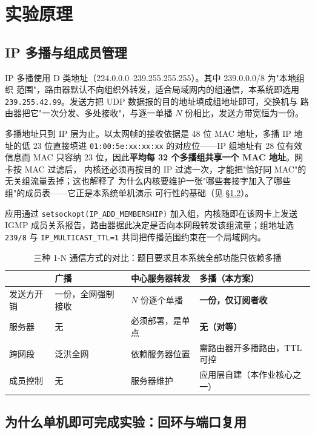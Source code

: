 \documentclass[11pt,a4paper,fontset=fandol]{ctexart}
\begin{document}
\section{实验原理}

\subsection{IP 多播与组成员管理}

IP 多播使用 D 类地址（224.0.0.0--239.255.255.255）。其中 239.0.0.0/8 为"本地组织
范围"，路由器默认不向组织外转发，适合局域网内的组通信，本系统即选用
\texttt{239.255.42.99}。发送方把 UDP 数据报的目的地址填成组地址即可，交换机与
路由器把它"一次分发、多处接收"，与逐一单播 $N$ 份相比，发送方带宽恒为一份。

多播地址只到 IP 层为止。以太网帧的接收依据是 48 位 MAC 地址，多播 IP 地址的低
23 位直接填进 \texttt{01:00:5e:xx:xx:xx} 的对应位——IP 组地址有 28 位有效信息而 MAC
只容纳 23 位，因此\textbf{平均每 32 个多播组共享一个 MAC 地址}。网卡按 MAC 过滤后，
内核还必须再按目的 IP 过滤一次，才能把"恰好同 MAC"的无关组流量丢掉；这也解释了
为什么内核要维护一张"哪些套接字加入了哪些组"的成员表——它正是本系统单机演示
可行性的基础（见 \S\ref{sec:loop}）。

应用通过 \texttt{setsockopt(IP\_ADD\_MEMBERSHIP)} 加入组，内核随即在该网卡上发送
IGMP 成员关系报告，路由器据此决定是否向本网段转发该组流量；组地址选 \texttt{239/8}
与 \texttt{IP\_MULTICAST\_TTL=1} 共同把传播范围约束在一个局域网内。

\begin{table}[H]
\centering\footnotesize
\begin{tabularx}{0.98\textwidth}{lXXX}
\toprule
 & 广播 & 中心服务器转发 & \textbf{多播（本方案）} \\
\midrule
发送方开销 & 一份，全网强制接收 & $N$ 份逐个单播 & \textbf{一份，仅订阅者收} \\
服务器 & 无 & 必须部署，是单点 & \textbf{无（对等）} \\
跨网段 & 泛洪全网 & 依赖服务器位置 & 需路由器开多播路由，TTL 可控 \\
成员控制 & 无 & 服务器维护 & 应用层自建（本作业核心之一） \\
\bottomrule
\end{tabularx}
\caption{三种 1-N 通信方式的对比：题目要求且本系统全部功能只依赖多播}
\label{tab:mc-cmp}
\end{table}

\subsection{为什么单机即可完成实验：回环与端口复用}
\label{sec:loop}
\end{document}
